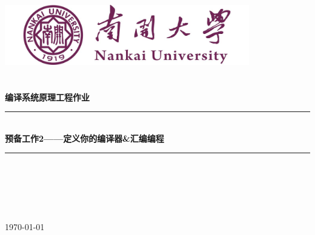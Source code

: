 \documentclass[UTF8,a4paper,10pt]{ctexart}
\newcommand{\HRule}{\rule{\linewidth}{0.5mm}}%
\begin{document}
\ttfamily
{}
\begin{titlepage}
    \begin{center}
    \includegraphics[width=0.8\textwidth]{pics/NKU.jpg}\\[1cm]    
    \textsc{\Huge {} }\\[0.9cm]
    \textsc{\huge {}}\\[0.5cm]
    \textsc{\Large \textbf{编译系统原理工程作业}}\\[0.8cm]
    \HRule \\[0.9cm]
    { \LARGE \bfseries 预备工作2——定义你的编译器\&汇编编程}\\[0.4cm]
    \HRule \\[2.0cm]
    \centering
    \textsc{\LARGE {}}\\[0.5cm]
    \textsc{\LARGE {}}\\[0.5cm]
    \textsc{\LARGE {}}\\[0.5cm]
    \textsc{\LARGE {}}\\[0.5cm]
    \vfill
    {\Large \today}
    \end{center}
\end{titlepage}
\end{document}
